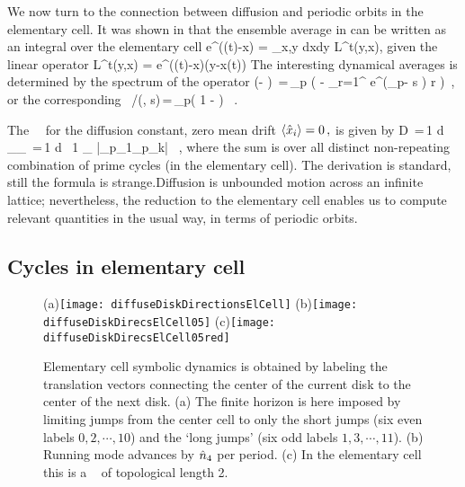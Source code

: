 \documentclass[aps,pre,
                showpacs,
                twocolumn,
                groupedaddress,
                floatfix]{revtex4-1}
\begin{document}

We now turn to the connection between diffusion and periodic orbits in the elementary cell. It was shown in  that the ensemble average in can be written as an integral over the elementary cell
\beq
\langle e^{\beta\cdot(\hx(t)-x)} \rangle
   = \int_{x,y\in \pS} dxdy {\cal L}^t(y,x),
\eeq
given the linear \evOper operator
\beq
{\cal L}^t(y,x) = e^{\beta\cdot(\hx(t)-x)}\delta(y-x(t))
\label{eq-eOper}
\eeq
The interesting dynamical averages is determined by the spectrum of the operator
\beq \det(\eigenvL - \Lop) \,=\,\prod_{p} \exp \left(
  - { \sum_{r=1}^ { e^{(\beta \cdot \hn_p- s
        ) r} \over {} }
  } \right) \,,
or the corresponding \dzeta\
/\zeta(\beta, s)\,=\,\prod_{p}\left( 1 - \frac{e^{(\beta \cdot \hn_p-
      s \period{p})}}{|\ExpaEig_p|} \right) ~.
\label{zeta-diff}
\eeq

The \dzeta\ \cycForm\ for the diffusion constant, zero mean drift
$ \left\langle { \hat{x}_i } \right\rangle = 0 \,, $ is given by
 \beq D \,=\,{1  d}
{ _\zeta \over \expct{\period{}}_\zeta } \,=\,{1
  \over 2 d } \, {1 \over \expct{\period{}}_\zeta} \sumprime
{}
{|\ExpaEig_{p_1}\cdots \ExpaEig_{p_k}|} \, ,
\label{eq-ecDiffCoef}
\eeq
where the sum is over all distinct non-repeating combination of prime cycles (in the elementary cell). The derivation is standard, still the formula is strange.Diffusion is unbounded motion across an infinite lattice; nevertheless, the reduction to the elementary cell enables us to compute relevant quantities in the usual way, in terms of periodic orbits.

\subsection{Cycles in elementary cell}
\begin{figure}
  \begin{center}
    (a)\texttt{[image: diffuseDiskDirectionsElCell]}
    (b)\texttt{[image: diffuseDiskDirecsElCell05]}
    (c)\texttt{[image: diffuseDiskDirecsElCell05red]}
  \end{center}
  \caption{ Elementary cell symbolic dynamics is obtained by labeling the  translation vectors connecting the center of the current disk to the center of  the next disk. (a) The finite horizon is here imposed by limiting jumps from  the center cell to only the short jumps (six even labels $0, 2,\cdots,10$) and  the `long jumps' (six odd labels $1, 3,\cdots,11$). (b) Running mode   advances by $\hat n_4$ per period. (c) In the elementary cell this is  a \po\  of topological length 2.  }
  \label{fig-diskDirectionsElCell}
\end{figure}
\end{document}
